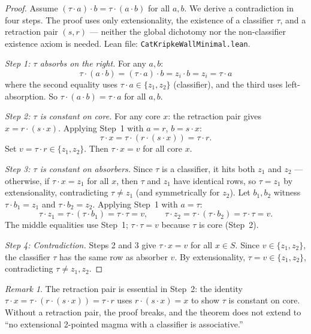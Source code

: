 \documentclass[sigconf,screen,review,anonymous]{acmart}
\newcommand{\dotop}{\cdot}
\theoremstyle{remark}
\newtheorem{remark}{Remark}
\begin{document}
\begin{proof}
Assume $(\tau \dotop a) \dotop b = \tau \dotop (a \dotop b)$ for all $a, b$. We derive a contradiction in four steps. The proof uses only extensionality, the existence of a classifier $\tau$, and a retraction pair $(s, r)$ --- neither the global dichotomy nor the non-classifier existence axiom is needed. Lean file: \texttt{CatKripkeWallMinimal.lean}.

\emph{Step 1: $\tau$ absorbs on the right.} For any $a, b$:
\[
\tau \dotop (a \dotop b)
= (\tau \dotop a) \dotop b
= z_i \dotop b
= z_i
= \tau \dotop a
\]
where the second equality uses $\tau \dotop a \in \{z_1, z_2\}$ (classifier), and the third uses left-absorption. So $\tau \dotop (a \dotop b) = \tau \dotop a$ for all $a, b$.

\emph{Step 2: $\tau$ is constant on core.} For any core $x$: the retraction pair gives $x = r \dotop (s \dotop x)$. Applying Step~1 with $a = r$, $b = s \dotop x$:
\[
\tau \dotop x = \tau \dotop (r \dotop (s \dotop x)) = \tau \dotop r.
\]
Set $v = \tau \dotop r \in \{z_1, z_2\}$. Then $\tau \dotop x = v$ for all core $x$.

\emph{Step 3: $\tau$ is constant on absorbers.} Since $\tau$ is a classifier, it hits both $z_1$ and $z_2$ --- otherwise, if $\tau \dotop x = z_1$ for all $x$, then $\tau$ and $z_1$ have identical rows, so $\tau = z_1$ by extensionality, contradicting $\tau \neq z_1$ (and symmetrically for $z_2$). Let $b_1, b_2$ witness $\tau \dotop b_1 = z_1$ and $\tau \dotop b_2 = z_2$. Applying Step~1 with $a = \tau$:
\[
\tau \dotop z_1 = \tau \dotop (\tau \dotop b_1) = \tau \dotop \tau = v,
\qquad
\tau \dotop z_2 = \tau \dotop (\tau \dotop b_2) = \tau \dotop \tau = v.
\]
The middle equalities use Step~1; $\tau \dotop \tau = v$ because $\tau$ is core (Step~2).

\emph{Step 4: Contradiction.} Steps 2 and 3 give $\tau \dotop x = v$ for all $x \in S$. Since $v \in \{z_1, z_2\}$, the classifier $\tau$ has the same row as absorber $v$. By extensionality, $\tau = v \in \{z_1, z_2\}$, contradicting $\tau \neq z_1, z_2$.
\end{proof}

\begin{remark}
The retraction pair is essential in Step~2: the identity $\tau \dotop x = \tau \dotop (r \dotop (s \dotop x)) = \tau \dotop r$ uses $r \dotop (s \dotop x) = x$ to show $\tau$ is constant on core. Without a retraction pair, the proof breaks, and the theorem does not extend to ``no extensional 2-pointed magma with a classifier is associative.''
\end{remark}
\end{document}
